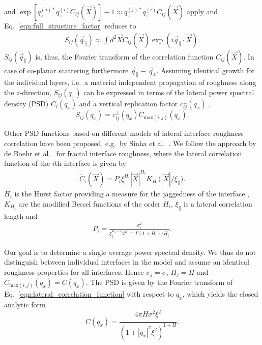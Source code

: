 and $\exp [q_z^{(j)*} q_z^{(i)} C_{ij}(\vec{X})]-1 \approx q_z^{(j)*} q_z^{(i)} C_{ij}(\vec{X})$ apply and Eq.~\eqref{eqn:full_structure_factor} reduces to
\begin{align}
S_{ij}(\vec{q}_\parallel) \approx \int d^2 \vec{X} C_{ij}(\vec{X}) \exp(i \vec{q}_\parallel \cdot \vec{X}) \text{.} \label{eqn:reduced_structure_factor}
\end{align}
$S_{ij}(\vec{q}_\parallel)$ is, thus, the Fourier transform of the correlation function $C_{ij}(\vec{X})$. In case of co-planar scattering furthermore $\vec{q}_\parallel \equiv \vec{q}_x$.
Assuming identical growth for the individual layers, i.e.~a material independent propagation of roughness along the $z$-direction, $S_{ij}(q_x)$ can be expressed in terms of the lateral power spectral density (PSD) $C_{i}(q_x)$ and a vertical replication factor $c_{ij}^{\perp}(q_x)$ \cite{spiller_multilayer_1993},
\begin{equation}
        S_{ij}(q_x) = c_{ij}^{\perp}(q_x) C_{\text{max}(i,j)}(q_x)\text{.} \label{eqn:factorized_structure_factor}
\end{equation}

Other PSD functions based on different models of lateral interface roughness correlation have been proposed, e.g.~by Sinha et al.~\cite{sinha_x-ray_1988}. We follow the approach by de Boehr et al.~\cite{boer_influence_1994,de_boer_x-ray_1995} for fractal interface roughness, where the lateral correlation function of the $i$th interface is given by
\begin{align}
\tilde{C}_i(\vec{X}) = P_i \xi_\parallel^{H_i} |\vec{X}|^{H_i} K_{H_i}\Big(|\vec{X}|/\xi_\parallel\Big) \text{.} \label{eqn:lateral_correlation_function}
\end{align}
$H_i$ is the Hurst factor providing a measure for the jaggedness of the interface \cite{sinha_x-ray_1988}, $K_{H_i}$ are the modified Bessel functions of the order $H_i$, $\xi_\parallel$ is a lateral correlation length and
\begin{align}
P_i = \frac{\sigma_i^2}{\xi_\parallel^{H_i-1} 2^{H_i-1} \Gamma(1+H_i)/H_i}\text{.}
\end{align}

Our goal is to determine a single average power spectral density. We thus do not distinguish between individual interfaces in the model and assume an identical roughness properties for all interfaces. Hence $\sigma_j = \sigma$, $H_j = H$ and $C_{\text{max}(i,j)}(q_x) = C(q_x)$. The PSD is given by the Fourier transform of Eq.~\eqref{eqn:lateral_correlation_function} with respect to $q_x$, which yields the closed analytic form
\begin{equation}
        C(q_x) = \frac{4 \pi H \sigma^2 \xi_\parallel^2}{(1+|q_x|^2\xi_\parallel^2)^{1+H}} \text{.} \label{eqn:psd} 
\end{equation}

